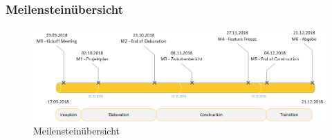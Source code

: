 \subsubsection{Meilensteinübersicht}
\begin{figure}[H]
    \centering
    \includegraphics[width=1\linewidth]{assets/meilensteinuebersicht}
    \caption{Meilensteinübersicht}
\end{figure}
\clearpage


